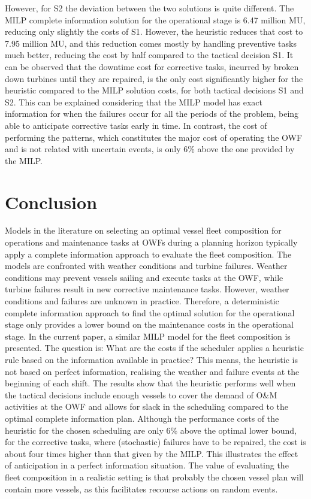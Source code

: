 However, for S2 the deviation between the two solutions is quite different. The MILP complete information solution for the operational stage is 6.47 million MU, reducing only slightly the costs of S1. However, the heuristic reduces that cost to 7.95 million MU, and this reduction comes mostly by handling preventive tasks much better, reducing the cost by half compared to the tactical decision S1. It can be observed that the downtime cost for corrective tasks, incurred by broken down turbines until they are repaired, is the only cost significantly higher for the heuristic compared to the MILP solution costs, for both tactical decisions S1 and S2. This can be explained considering that the MILP model has exact information for when the failures occur for all the periods of the problem, being able to anticipate corrective tasks early in time. In contrast, the cost of performing the patterns, which constitutes the major cost of operating the OWF and is not related with uncertain events, is only  6\% above the one provided by the MILP.





\section{Conclusion}
\label{sec:conclusion}
Models in the literature on selecting an optimal vessel fleet composition for operations and maintenance tasks at OWFs during a planning horizon typically apply a complete information approach to evaluate the fleet composition. The models are confronted with weather conditions and turbine failures. Weather conditions may prevent vessels sailing and execute tasks at the OWF, while turbine failures result in new corrective maintenance tasks. However, weather conditions and failures are unknown in practice. Therefore, a deterministic complete information approach to find the optimal solution for the operational stage only provides a lower bound on the maintenance costs in the operational stage. In the current paper, a similar MILP model for the fleet composition is presented. The question is: What are the costs if the scheduler applies a heuristic rule based on the information available in practice? This means, the heuristic is not based on perfect information, realising the weather and failure events at the beginning of each shift. The results show that the heuristic performs well  when the tactical decisions include enough vessels to cover the demand of O\&M activities at the OWF and allows for slack in the scheduling compared to the optimal complete information plan. Although the performance costs of the heuristic for the chosen scheduling are only 6\% above the optimal lower bound, for the corrective tasks, where (stochastic) failures have to be repaired, the cost is about four times higher than that given by the MILP. This illustrates the effect of anticipation in a perfect information situation. The value of evaluating the fleet composition in a realistic setting is that probably the chosen vessel plan will contain more vessels, as this facilitates recourse actions on random events.

%
%


%
